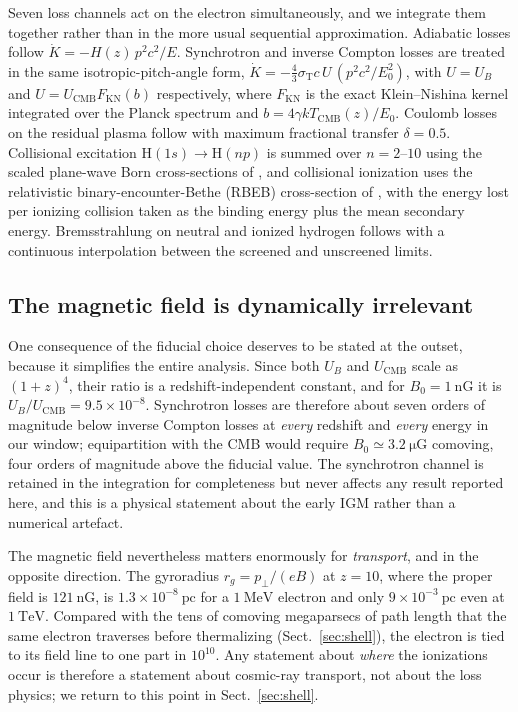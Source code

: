 \documentclass[twocolumn]{article}
\begin{document}
Seven loss channels act on the electron simultaneously, and we integrate them
together rather than in the more usual sequential approximation. Adiabatic
losses follow $\dot K = -H(z)\,p^{2}c^{2}/E$. Synchrotron and inverse Compton
losses are treated in the same isotropic-pitch-angle form,
$\dot K = -\tfrac{4}{3}\sigma_{\mathrm{T}} c\,U\,(p^{2}c^{2}/E_0^{2})$, with
$U = U_B$ and $U = U_{\mathrm{CMB}} F_{\mathrm{KN}}(b)$ respectively, where
$F_{\mathrm{KN}}$ is the exact Klein--Nishina kernel integrated over the Planck
spectrum \citep{Blumenthal1970} and $b = 4\gamma k T_{\mathrm{CMB}}(z)/E_0$.
Coulomb losses on the residual plasma follow \citet{Gould1972} with maximum
fractional transfer $\delta = 0.5$. Collisional excitation
$\mathrm{H}(1s)\!\rightarrow\!\mathrm{H}(np)$ is summed over $n = 2$--$10$
using the scaled plane-wave Born cross-sections of \citet{Stone2002}, and
collisional ionization uses the relativistic binary-encounter-Bethe (RBEB)
cross-section of \citet{Kim2000}, with the energy lost per ionizing collision
taken as the binding energy plus the mean secondary energy. Bremsstrahlung on
neutral and ionized hydrogen follows \citet{Blumenthal1970} with a continuous
interpolation between the screened and unscreened limits.

\subsection{The magnetic field is dynamically irrelevant}

One consequence of the fiducial choice deserves to be stated at the outset,
because it simplifies the entire analysis. Since both $U_B$ and
$U_{\mathrm{CMB}}$ scale as $(1+z)^{4}$, their ratio is a redshift-independent
constant, and for $B_0 = 1\ \mathrm{nG}$ it is
$U_B/U_{\mathrm{CMB}} = 9.5\times10^{-8}$. Synchrotron losses are therefore
about seven orders of magnitude below inverse Compton losses at \emph{every}
redshift and \emph{every} energy in our window; equipartition with the CMB
would require $B_0 \simeq 3.2\ \mathrm{\mu G}$ comoving, four orders of
magnitude above the fiducial value. The synchrotron channel is retained in the
integration for completeness but never affects any result reported here, and
this is a physical statement about the early IGM rather than a numerical
artefact.

The magnetic field nevertheless matters enormously for \emph{transport}, and in
the opposite direction. The gyroradius $r_g = p_\perp/(eB)$ at $z = 10$, where
the proper field is $121\ \mathrm{nG}$, is $1.3\times10^{-8}\ \mathrm{pc}$ for
a $1\ \mathrm{MeV}$ electron and only $9\times10^{-3}\ \mathrm{pc}$ even at
$1\ \mathrm{TeV}$. Compared with the tens of comoving megaparsecs of path
length that the same electron traverses before thermalizing
(Sect.~\ref{sec:shell}), the electron is tied to its field line to one part in
$10^{10}$. Any statement about \emph{where} the ionizations occur is therefore
a statement about cosmic-ray transport, not about the loss physics; we return
to this point in Sect.~\ref{sec:shell}.
\end{document}
